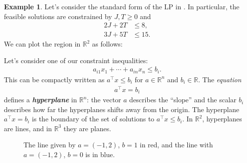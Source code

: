 \documentclass[a4paper, 12pt]{article}
\numberwithin{equation}{section}
\numberwithin{figure}{section}
\theoremstyle{definition}
\newtheorem{ex}[thm]{Example}
\renewcommand{\leq}{\leqslant}
\renewcommand{\geq}{\geqslant}
\newcommand{\R}{\mathbb{R}}
\newcommand{\define}[1]{\textbf{\textit{#1}}}
\begin{document}
\begin{ex}
	Let's consider the standard form of the LP in . In
	particular, the feasible solutions are constrained by $J,T \geq 0$ and 
	\begin{align*}
		2J + 2T &\leq 8, \\
		3J + 5T &\leq 15.
	\end{align*}
	We can plot the region in $\R^2$ as follows:
	\begin{center}
	\end{center}
\end{ex}

Let's consider one of our constraint inequalities:
\begin{align*}
	a_{i1}x_1 + \cdots + a_{in}x_n \leq b_i.
\end{align*}
This can be compactly written as $a^{\top}x \leq b_i$ for $a\in\R^n$ and $b_i\in
\R$. The \emph{equation} 
\begin{align*}
	a^{\top}x = b_i 
\end{align*}
defines a \define{hyperplane} in $\R^n$: the vector $a$ describes the ``slope''
and the scalar $b_i$ describes how far the hyperplanes shifts away from the
origin. The hyperplane $a^{\top}x = b_i$ is the boundary of the set of solutions
to $a^{\top}x \leq b_i$. In $\R^2$, hyperplanes are lines, and in $\R^3$ they
are planes. 

\begin{figure}[h]
	\centering 
	\caption{The line given by $a = (-1, 2)$, $b=1$ in red, and the line with $a = (-1, 2)$, $b=0$ is in blue.}
\end{figure}
\end{document}

